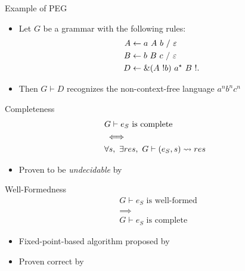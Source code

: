 \documentclass{beamer}
\begin{document}
\begin{frame}{Example of PEG}
    \begin{itemize}
        \item Let $G$ be a grammar with the following rules:
        \begin{align*}
            A& \leftarrow a\ A\ b\ /\ \varepsilon \\
            B& \leftarrow b\ B\ c\ /\ \varepsilon \\
            D& \leftarrow \&(A\ !b)\ a^\star\ B\ !.{}
        \end{align*}
        \item Then $G \vdash D$ recognizes the non-context-free language $a^n b^n c^n$
    \end{itemize}
\end{frame}

\begin{frame}{Completeness}
    \begin{align*}
        & \text{$G \vdash e_S$ is complete} \\
        & \iff \\
        & \forall s,\ \exists res,\ G \vdash (e_S, s) \rightsquigarrow res
    \end{align*}
    \begin{itemize}
        \item Proven to be \emph{undecidable} by \citeauthor{ford_parsing_2004}
    \end{itemize}
\end{frame}

\begin{frame}{Well-Formedness}
    \begin{align*}
        & \text{$G \vdash e_S$ is well-formed} \\
        & \implies \\
        & \text{$G \vdash e_S$ is complete}
    \end{align*}
    \begin{itemize}
        \item Fixed-point-based algorithm proposed by \cite{ford_parsing_2004}
        \item Proven correct by \cite{koprowski_trx_2011}
    \end{itemize}
\end{frame}
\end{document}
